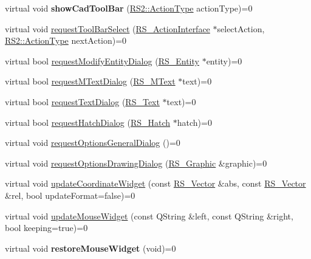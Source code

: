 \begin{DoxyCompactItemize}
\item 
\hypertarget{classRS__DialogFactoryInterface_ab654c8d33b398d0f99c51b3869ca4aa2}{virtual void {\bfseries show\-Cad\-Tool\-Bar} (\hyperlink{classRS2_afe3523e0bc41fd637b892321cfc4b9d7}{R\-S2\-::\-Action\-Type} action\-Type)=0}\label{classRS__DialogFactoryInterface_ab654c8d33b398d0f99c51b3869ca4aa2}

\item 
virtual void \hyperlink{classRS__DialogFactoryInterface_a50be8fdda1e8a2060b70adf8972a2857}{request\-Tool\-Bar\-Select} (\hyperlink{classRS__ActionInterface}{R\-S\-\_\-\-Action\-Interface} $\ast$select\-Action, \hyperlink{classRS2_afe3523e0bc41fd637b892321cfc4b9d7}{R\-S2\-::\-Action\-Type} next\-Action)=0
\item 
virtual bool \hyperlink{classRS__DialogFactoryInterface_a8dad4c0a48e3299f758ebd7c20cee05a}{request\-Modify\-Entity\-Dialog} (\hyperlink{classRS__Entity}{R\-S\-\_\-\-Entity} $\ast$entity)=0
\item 
virtual bool \hyperlink{classRS__DialogFactoryInterface_ae1618dacc9e6c8c969be486b22ff8617}{request\-M\-Text\-Dialog} (\hyperlink{classRS__MText}{R\-S\-\_\-\-M\-Text} $\ast$text)=0
\item 
virtual bool \hyperlink{classRS__DialogFactoryInterface_a906e43ced9e640964115a9e58e277ff4}{request\-Text\-Dialog} (\hyperlink{classRS__Text}{R\-S\-\_\-\-Text} $\ast$text)=0
\item 
virtual bool \hyperlink{classRS__DialogFactoryInterface_a5edf0344de81ea6585ef8e4dc4f4a7c2}{request\-Hatch\-Dialog} (\hyperlink{classRS__Hatch}{R\-S\-\_\-\-Hatch} $\ast$hatch)=0
\item 
virtual void \hyperlink{classRS__DialogFactoryInterface_a494de4c323d61be319f88b7a37026e6b}{request\-Options\-General\-Dialog} ()=0
\item 
virtual void \hyperlink{classRS__DialogFactoryInterface_a115e1f29d6419c20d02c185b13dfea37}{request\-Options\-Drawing\-Dialog} (\hyperlink{classRS__Graphic}{R\-S\-\_\-\-Graphic} \&graphic)=0
\item 
virtual void \hyperlink{classRS__DialogFactoryInterface_ac5b510d50ec73019bc67683b163f5840}{update\-Coordinate\-Widget} (const \hyperlink{classRS__Vector}{R\-S\-\_\-\-Vector} \&abs, const \hyperlink{classRS__Vector}{R\-S\-\_\-\-Vector} \&rel, bool update\-Format=false)=0
\item 
virtual void \hyperlink{classRS__DialogFactoryInterface_ab94aa4be2d7e656ff2092b96dcada744}{update\-Mouse\-Widget} (const Q\-String \&left, const Q\-String \&right, bool keeping=true)=0
\item 
\hypertarget{classRS__DialogFactoryInterface_aa49a6763ec39fa8a2a75af0cb51fa8bc}{virtual void {\bfseries restore\-Mouse\-Widget} (void)=0}\label{classRS__DialogFactoryInterface_aa49a6763ec39fa8a2a75af0cb51fa8bc}


\end{DoxyCompactItemize}
